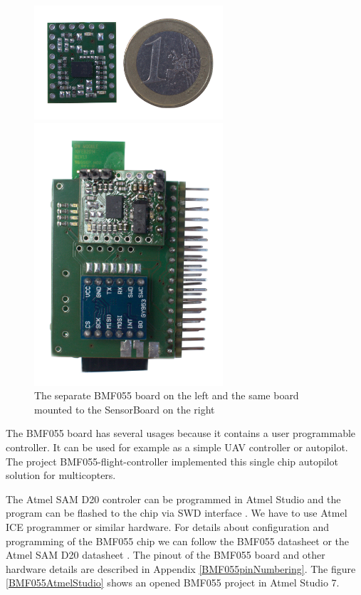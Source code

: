 \begin{figure}
    \centering
    \label{BMF055photo}
    \caption{The separate BMF055 board on the left and the same board mounted to the SensorBoard on the right}
    \begin{minipage}[c]{.45\textwidth}
        \includegraphics[width=7cm]{img/BMF055.jpg}
    \end{minipage}
    \quad\vrule{}
    \begin{minipage}[c]{.45\textwidth}
        \includegraphics[width=7cm]{img/HWassembledNoCoin.jpg}
    \end{minipage}
\end{figure}

The BMF055 board has several usages because it contains a user programmable controller. It can be used for example as a simple UAV controller or autopilot. The project BMF055-flight-controller \cite{BMF055flightController} implemented this single chip autopilot solution for multicopters.

The Atmel SAM D20 controler \cite{atmel:samd20} can be programmed in Atmel Studio \cite{AtmelStudio} and the program can be flashed to the chip via \ac{SWD} interface \cite{SWDinterface}. We have to use Atmel ICE programmer \cite{AtmelICE} or similar hardware. For details about configuration and programming of the BMF055 chip we can follow the BMF055 datasheet \cite{bosch:BMF055} or the Atmel SAM D20 datasheet \cite{atmel:samd20}. The pinout of the BMF055 board and other hardware details are described in Appendix \ref{BMF055pinNumbering}. The figure \ref{BMF055AtmelStudio} shows an opened BMF055 project in Atmel Studio 7.

